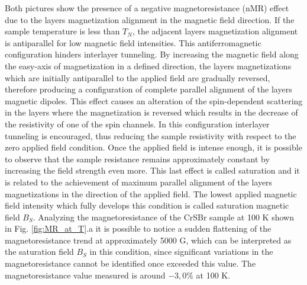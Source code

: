 \documentclass[journal]{IEEEtran}
\begin{document}
\noindent Both pictures show the presence of a negative magnetoresistance (nMR) effect due to the layers magnetization alignment in the magnetic field direction. If the sample temperature is less than $T_N$, the adjacent layers magnetization alignment is antiparallel for low magnetic field intensities. This antiferromagnetic configuration hinders interlayer tunneling. By increasing the magnetic field along the easy-axis of magnetization in a defined direction, the layers magnetizations which are initially antiparallel to the applied field are gradually reversed, therefore producing a configuration of complete parallel alignment of the layers magnetic dipoles. This effect causes an alteration of the spin-dependent scattering in the layers where the magnetization is reversed which results in the decrease of the resistivity of one of the spin channels. In this configuration interlayer tunneling is encouraged, thus reducing the sample resistivity with respect to the zero applied field condition.
Once the applied field is intense enough, it is possible to observe that the sample resistance remains approximately constant by increasing the field strength even more. This last effect is called saturation and it is related to the achievement of maximum parallel alignment of the layers magnetizations in the direction of the applied field. The lowest applied magnetic field intensity which fully develops this condition is called saturation magnetic field $B_S$. Analyzing the magnetoresistance of the CrSBr sample at 100 K shown in Fig. \ref{fig:MR_at_T}.a it is possible to notice a sudden flattening of the magnetoresistance trend at approximately 5000 G, which can be interpreted as the saturation field $B_S$ in this condition, since significant variations in the magnetoresistance cannot be identified once exceeded this value. 
The magnetoresistance value measured is around $-3,0\%$ at 100 K.
\end{document}
